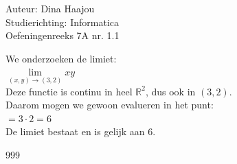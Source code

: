 \documentclass[a4paper]{article}
\begin{document}
\normalsize

\noindent \large Auteur: Dina Haajou \\
\noindent \large Studierichting: Informatica \\
\noindent \large Oefeningenreeks 7A nr. 1.1 \\

\medskip

\normalsize

We onderzoeken de limiet:\\

$ \lim\limits_{(x,y)\to(3,2)} xy $ \\

Deze functie is continu in heel $\mathbb{R}^2$, dus ook in $(3,2)$.\\

Daarom mogen we gewoon evalueren in het punt:\\

$= 3 \cdot 2 = 6$ \\

De limiet bestaat en is gelijk aan $6$. \\

\begin{thebibliography}{999}
\end{thebibliography}
\end{document}
